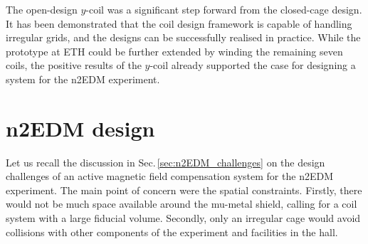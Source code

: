 

The open-design $y$-coil was a significant step forward from the closed-cage design.
It has been demonstrated that the coil design framework is capable of handling irregular grids, and the designs can be successfully realised in practice.
While the prototype at ETH could be further extended by winding the remaining seven coils, the positive results of the $y$-coil already supported the case for designing a system for the n2EDM experiment.




\section{n2EDM design}
Let us recall the discussion in Sec.\,\ref{sec:n2EDM_challenges} on the design challenges of an active magnetic field compensation system for the n2EDM experiment.
The main point of concern were the spatial constraints.
Firstly, there would not be much space available around the mu-metal shield, calling for a coil system with a large fiducial volume.
Secondly, only an irregular cage would avoid collisions with other components of the experiment and facilities in the hall.

